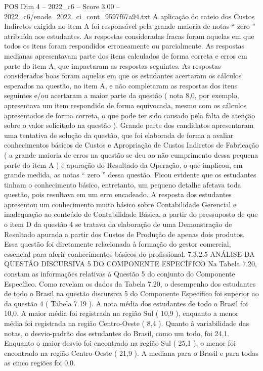 \begin{textsample}{POS Dim 4 – 2022\_c6 – Score 3.00 – 2022\_c6/enade\_2022\_ci\_cont\_9597f67a94.txt}
A aplicação do rateio dos Custos Indiretos exigida no item A foi responsável pela grande maioria de notas “ zero ” atribuída aos estudantes.
As respostas consideradas fracas foram aquelas em que todos os itens foram respondidos erroneamente ou parcialmente.
As respostas medianas apresentavam parte dos itens calculados de forma correta e erros em parte do item A, que impactaram as respostas seguintes.
As respostas consideradas boas foram aquelas em que os estudantes acertaram os cálculos esperados na questão, no item A, e não completaram as respostas dos itens seguintes e/ou acertaram a maior parte da questão ( nota 8,0, por exemplo, apresentava um item respondido de forma equivocada, mesmo com os cálculos apresentados de forma correta, o que pode ter sido causado pela falta de atenção sobre o valor solicitado na questão ).
Grande parte dos candidatos apresentaram uma tentativa de solução da questão, que foi elaborada de forma a avaliar conhecimentos básicos de Custos e Apropriação de Custos Indiretos de Fabricação ( a grande maioria de erros na questão se deu ao não cumprimento dessa pequena parte do item A ) e apuração do Resultado da Operação, o que implicou, em grande medida, as notas “ zero ” dessa questão.
Ficou evidente que os estudantes tinham o conhecimento básico, entretanto, um pequeno detalhe afetava toda questão, pois resultava em um erro encadeado.
A resposta dos estudantes apresentou um conhecimento muito básico sobre Contabilidade Gerencial e inadequação ao conteúdo de Contabilidade Básica, a partir do pressuposto de que o item D da questão 4 se tratava da elaboração de uma Demonstração de Resultado apurada a partir dos Custos de Produção de apenas dois produtos.
Essa questão foi diretamente relacionada à formação do gestor comercial, essencial para aferir conhecimentos básicos do profissional. 7.3.2.5 ANÁLISE DA QUESTÃO DISCURSIVA 5 DO COMPONENTE ESPECÍFICO Na Tabela 7.20, constam as informações relativas à Questão 5 do conjunto do Componente Específico.
Como revelam os dados da Tabela 7.20, o desempenho dos estudantes de todo o Brasil na questão discursiva 5 do Componente Específico foi superior ao da questão 4 ( Tabela 7.19 ).
A nota média dos estudantes de todo o Brasil foi 10,0.
A maior média foi registrada na região Sul ( 10,9 ), enquanto a menor média foi registrada na região Centro-Oeste ( 8,4 ).
Quanto à variabilidade das notas, o desvio-padrão dos estudantes do Brasil, como um todo, foi 24,1.
Enquanto o maior desvio foi encontrado na região Sul ( 25,1 ), o menor foi encontrado na região Centro-Oeste ( 21,9 ).
A mediana para o Brasil e para todas as cinco regiões foi 0,0.

\end{textsample}
